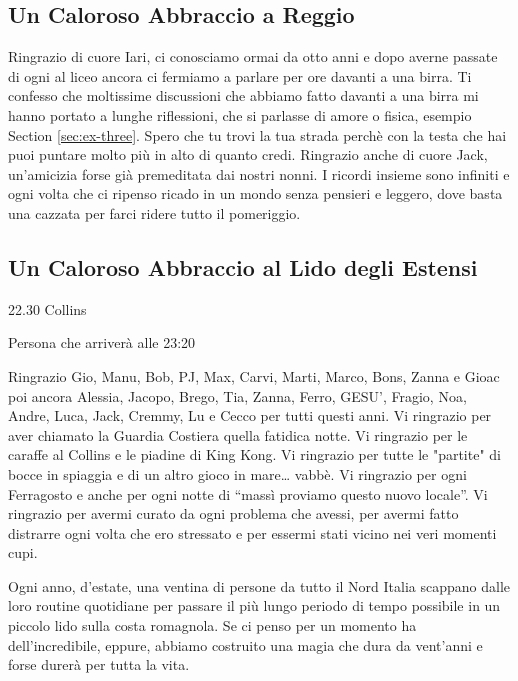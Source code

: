 \subsection*{Un Caloroso Abbraccio a Reggio}

Ringrazio di cuore Iari, ci conosciamo ormai da otto anni e dopo averne passate di ogni al liceo ancora ci fermiamo a parlare per ore davanti a una birra. Ti confesso che moltissime discussioni che abbiamo fatto davanti a una birra mi hanno portato a lunghe riflessioni, che si parlasse di amore o fisica, esempio Section \ref{sec:ex-three}. Spero che tu trovi la tua strada perchè con la testa che hai puoi puntare molto più in alto di quanto credi. Ringrazio anche di cuore Jack, un’amicizia forse già premeditata dai nostri nonni. I ricordi insieme sono infiniti e ogni volta che ci ripenso ricado in un mondo senza pensieri e leggero, dove basta una cazzata per farci ridere tutto il pomeriggio.

\subsection*{Un Caloroso Abbraccio al Lido degli Estensi}

\epigraph{22.30 Collins}{Persona che arriverà alle 23:20}

Ringrazio Gio, Manu, Bob, PJ, Max, Carvi, Marti, Marco, Bons, Zanna e Gioac poi ancora Alessia, Jacopo, Brego, Tia, Zanna, Ferro, GESU’, Fragio, Noa, Andre, Luca, Jack, Cremmy, Lu e Cecco per tutti questi anni. Vi ringrazio per aver chiamato la Guardia Costiera quella fatidica notte. Vi ringrazio per le caraffe al Collins e le piadine di King Kong. Vi ringrazio per tutte le "partite" di bocce in spiaggia e di un altro gioco in mare… vabbè. Vi ringrazio per ogni Ferragosto e anche per ogni notte di “massì proviamo questo nuovo locale”.
Vi ringrazio per avermi curato da ogni problema che avessi, per avermi fatto distrarre ogni volta che ero stressato e per essermi stati vicino nei veri momenti cupi. 

\vspace{0.2cm}

Ogni anno, d’estate, una ventina di persone da tutto il Nord Italia scappano dalle loro routine quotidiane per passare il più lungo periodo di tempo possibile in un piccolo lido sulla costa romagnola. Se ci penso per un momento ha dell’incredibile, eppure, abbiamo costruito una magia che dura da vent’anni e forse durerà per tutta la vita.






